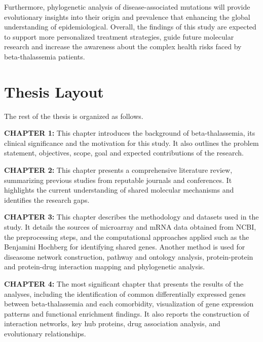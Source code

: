 Furthermore, phylogenetic analysis of disease-associated mutations will provide evolutionary insights into their origin and prevalence that enhancing the global understanding of epidemiological. Overall, the findings of this study are expected to support more personalized treatment strategies, guide future molecular research and increase the awareness about the complex health risks faced by beta-thalassemia patients.

\section{Thesis Layout}
\label{sec:sec01}

The rest of the thesis is organized as follows.

\vspace{0.5cm}
\textbf{CHAPTER 1:}
This chapter introduces the background of beta-thalassemia, its clinical significance and the motivation for this study. It also outlines the problem statement, objectives, scope, goal and expected contributions of the research.

\vspace{0.2cm}

\textbf{CHAPTER 2:}
This chapter presents a comprehensive literature review, summarizing previous studies from reputable journals and conferences. It highlights the current understanding of shared molecular mechanisms and identifies the research gaps.

\vspace{0.2cm}

\textbf{CHAPTER 3:}
This chapter describes the methodology and datasets used in the study. It details the sources of microarray and mRNA data obtained from NCBI, the preprocessing steps, and the computational approaches applied such as the Benjamini Hochberg for identifying shared genes. Another method is used for diseasome network construction, pathway and ontology analysis, protein-protein and protein-drug interaction mapping and phylogenetic analysis.

\vspace{0.2cm}

\textbf{CHAPTER 4:}
The most significant chapter that presents the results of the analyses, including the identification of common differentially expressed genes between beta-thalassemia and each comorbidity, visualization of gene expression patterns and functional enrichment findings. It also reports the construction of interaction networks, key hub proteins, drug association analysis, and evolutionary relationships.


